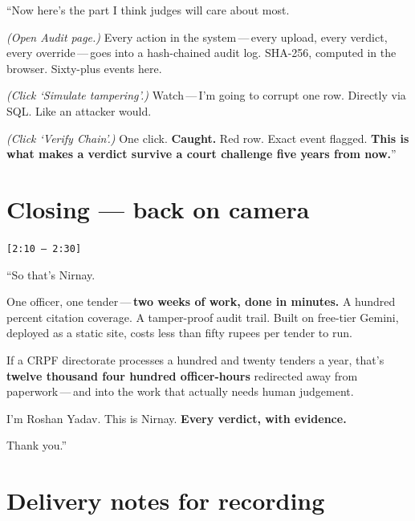 \documentclass[11pt,a4paper]{article}
\newcommand{\ts}[1]{{\small\color{accent}\texttt{[#1]}}}
\begin{document}
\begin{spoken}
``Now here's the part I think judges will care about most.

\smallskip
\emph{(Open Audit page.)} Every action in the system\,---\,every upload, every verdict, every override\,---\,goes into a hash-chained audit log. SHA-256, computed in the browser. Sixty-plus events here.

\smallskip
\emph{(Click `Simulate tampering'.)} Watch\,---\,I'm going to corrupt one row. Directly via SQL. Like an attacker would.

\smallskip
\emph{(Click `Verify Chain'.)} One click. \textbf{Caught.} Red row. Exact event flagged. \textbf{This is what makes a verdict survive a court challenge five years from now.}''
\end{spoken}

\section{Closing --- back on camera}
\ts{2:10 -- 2:30}

\begin{spoken}
``So that's Nirnay.

\smallskip
One officer, one tender\,---\,\textbf{two weeks of work, done in minutes.} A hundred percent citation coverage. A tamper-proof audit trail. Built on free-tier Gemini, deployed as a static site, costs less than fifty rupees per tender to run.

\smallskip
If a CRPF directorate processes a hundred and twenty tenders a year, that's \textbf{twelve thousand four hundred officer-hours} redirected away from paperwork\,---\,and into the work that actually needs human judgement.

\smallskip
I'm Roshan Yadav. This is Nirnay. \textbf{Every verdict, with evidence.}

\smallskip
Thank you.''
\end{spoken}

\section{Delivery notes for recording}
\end{document}
